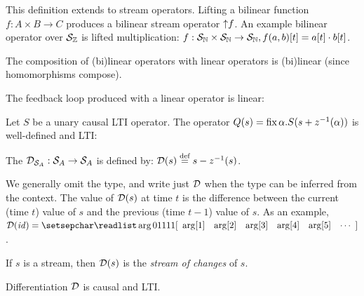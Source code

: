 This definition extends to stream operators.
Lifting a bilinear function $f: A \times B \to C$ produces
a bilinear stream operator ${\uparrow}f$.  An example bilinear operator over $\mathcal{S}_{\mathbb{Z}}$
is lifted multiplication:
$f: \mathcal{S}_{\mathbb{N}} \times \mathcal{S}_{\mathbb{N}} \to \mathcal{S}_{\mathbb{N}}, f(a, b)[t] = a[t]\cdot b[t]$.  

The composition of (bi)linear operators with linear operators 
is (bi)linear (since homomorphisms compose).

The feedback loop produced with a linear operator is linear:

\begin{proposition}
\label{prop-rec-linear}
Let $S$ be a unary causal LTI operator. The
operator $Q(s)=\mbox{fix}\,\alpha.S(s+z^{-1}(\alpha))$ is well-defined and LTI:

\begin{center}
\end{center}
\end{proposition}

\begin{definition}[Differentiation]
The  $\mathcal{D}_{\mathcal{S}_{A}} : \mathcal{S}_{A} \to \mathcal{S}_{A}$ is defined by:
$\mathcal{D}(s) \stackrel{\textrm{\scriptsize def}}{=} s - z^{-1}(s)$.
\end{definition}
We generally omit the type, and write just $\mathcal{D}$ when the type can be inferred from the context.
The value of $\mathcal{D}(s)$ at time $t$ is the difference
between  the current (time $t$) value of $s$ and the previous (time $t-1$) value of $s$.
\ifstreamexamples
As an example, $\D(\id) = \sv{0 1 1 1 1}$.
\fi

If $s$ is a stream, then $\mathcal{D}(s)$ is the \emph{stream of changes} of $s$. 

\begin{proposition}
\label{prop-diff-properties}
Differentiation $\mathcal{D}$ is causal and LTI.
\end{proposition}

